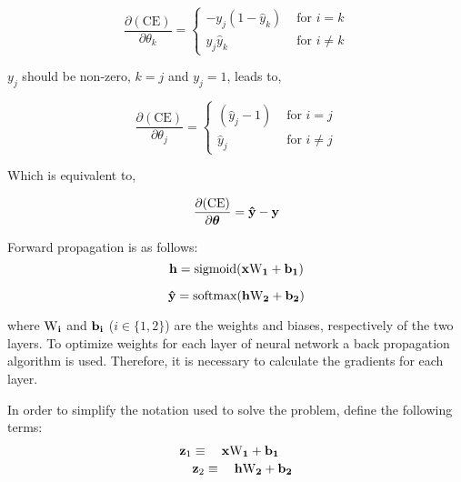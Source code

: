 \begin{equation}
\label{eq:CE_gradient}
\frac{\partial(\textrm{CE})}{\partial{\theta_{k}}} = \begin{cases}
-y_{j}(1 - \hat{y}_{k})&\text{ for }i=k \\
y_{j}\hat{y}_{k}&\text{ for }i\neq k
\end{cases}
\end{equation}

$y_{j}$ should be non-zero, $k=j$ and $y_{j}=1$, leads to,

\begin{equation}
\label{eq:equation_CE_5}
\frac{\partial(\textrm{CE})}{\partial{\theta_{j}}} = \begin{cases}
(\hat{y}_{j} - 1)&\text{ for }i=j \\
\hat{y}_{j}&\text{ for }i\neq j
\end{cases}
\end{equation}

Which is equivalent to,

\begin{equation}
\frac{\partial(\textrm{CE})}{\partial{\boldsymbol\theta}} = \bf{\hat{y}} - \bf{y}
\end{equation}

\noindent Forward propagation is as follows:
\begin{equation}
{\bf h} = \textrm{sigmoid}({\bf x\textrm{W}_{1} + b_{1}}) 
\end{equation}

\begin{equation}
\label{eq:equation2_7}
{\bf \hat{y}} = \textrm{softmax}({\bf h\textrm{W}_{2} + b_{2})}
\end{equation}

\noindent where $\bf{\textrm{W}}_i$ and $\bf{b}_{i}$ ($i\in\{1,2\}$) are
the weights and biases, respectively of the two layers.
\indent To optimize weights for each layer of neural network a back propagation algorithm is used. Therefore, it is necessary to calculate the gradients for each layer.
  
\noindent In order to simplify the notation used to solve the problem, define the following terms:
\begin{equation}
\label{eq:equation2_10}
\begin{multlined}
		 {\bf z}_{1}\equiv \quad{\bf x\textrm{W}_{1} + b_{1}} \\
		{\bf z}_{2}\equiv \quad{\bf h\textrm{W}_{2} + b_{2}}
\end{multlined}
\end{equation}

